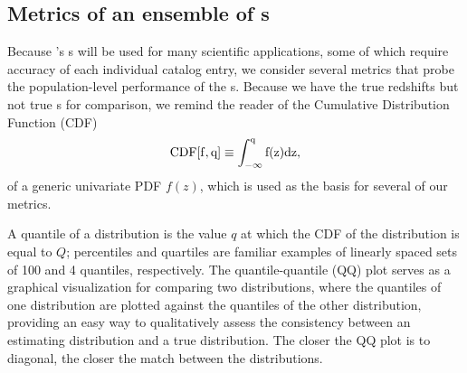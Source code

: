 \subsection{Metrics of an ensemble of \pzpdf s}

Because \lsst's \pzpdf s will be used for many scientific applications, some of which require accuracy of each individual catalog entry, we consider several metrics that probe the population-level performance of the \pzpdf s.
Because we have the true redshifts but not true \pzpdf s for comparison, we remind the reader of the Cumulative Distribution Function (CDF)
\begin{equation}
\eqlabel{eq:cdf}
\rm{CDF}[f, q] \equiv \int_{-\infty}^{q} f(z) dz,
\end{equation}
of a generic univariate PDF $f(z)$, which is used as the basis for several of our metrics.

A quantile of a distribution is the value $q$ at which the CDF of the distribution is equal to $Q$; percentiles and quartiles are familiar examples of linearly spaced sets of 100 and 4 quantiles, respectively.
The quantile-quantile (QQ) plot serves as a graphical visualization for comparing two distributions, where the quantiles of one distribution are plotted against the quantiles of the other distribution, providing an easy way to qualitatively assess the consistency between an estimating distribution and a true distribution.
The closer the QQ plot is to diagonal, the closer the match between the distributions.

